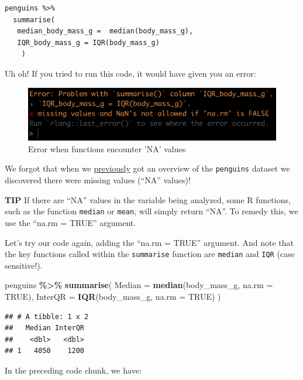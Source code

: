 \documentclass[
]{book}
\newenvironment{Shaded}{\begin{snugshade}}{\end{snugshade}}
\newcommand{\AttributeTok}[1]{\textcolor[rgb]{0.13,0.29,0.53}{#1}}
\newcommand{\ConstantTok}[1]{\textcolor[rgb]{0.56,0.35,0.01}{#1}}
\newcommand{\FunctionTok}[1]{\textcolor[rgb]{0.13,0.29,0.53}{\textbf{#1}}}
\newcommand{\NormalTok}[1]{#1}
\newcommand{\SpecialCharTok}[1]{\textcolor[rgb]{0.81,0.36,0.00}{\textbf{#1}}}
\begin{document}
\begin{verbatim}
penguins %>%
  summarise(
   median_body_mass_g =  median(body_mass_g),
   IQR_body_mass_g = IQR(body_mass_g)
    )
\end{verbatim}

Uh oh! If you tried to run this code, it would have given you an error:

\begin{figure}
\includegraphics[width=18in]{./more/na_error} \caption{Error when functions encounter 'NA' values}\label{fig:unnamed-chunk-34}
\end{figure}

We forgot that when we \hyperref[vis_data_overview]{previously} got an overview of the \texttt{penguins} dataset we discovered there were missing values (``NA'' values)!

\textbf{TIP}
If there are ``NA'' values in the variable being analyzed, some R functions, such as the function \texttt{median} or \texttt{mean}, will simply return ``NA''. To remedy this, we use the ``na.rm = TRUE'' argument.

Let's try our code again, adding the ``na.rm = TRUE'' argument. And note that the key functions called within the \texttt{summarise} function are \texttt{median} and \texttt{IQR} (case sensitive!).

\begin{Shaded}
\begin{Highlighting}[]
\NormalTok{penguins }\SpecialCharTok{\%\textgreater{}\%}
  \FunctionTok{summarise}\NormalTok{(}
   \AttributeTok{Median =}  \FunctionTok{median}\NormalTok{(body\_mass\_g, }\AttributeTok{na.rm =} \ConstantTok{TRUE}\NormalTok{),}
   \AttributeTok{InterQR =} \FunctionTok{IQR}\NormalTok{(body\_mass\_g, }\AttributeTok{na.rm =} \ConstantTok{TRUE}\NormalTok{)}
\NormalTok{    )}
\end{Highlighting}
\end{Shaded}

\begin{verbatim}
## # A tibble: 1 x 2
##   Median InterQR
##    <dbl>   <dbl>
## 1   4050    1200
\end{verbatim}

In the preceding code chunk, we have:
\end{document}
